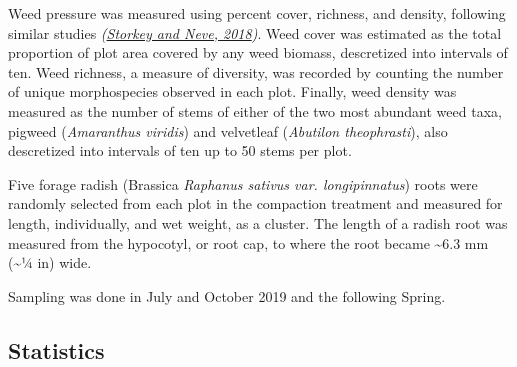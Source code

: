 \documentclass[
  12pt,
]{article}
\begin{document}
Weed pressure was measured using percent cover, richness, and density, following similar studies \emph{(\protect\hyperlink{ref-storkey18}{Storkey and Neve, 2018})}.
Weed cover was estimated as the total proportion of plot area covered by any weed biomass, descretized into intervals of ten.
Weed richness, a measure of diversity, was recorded by counting the number of unique morphospecies observed in each plot.
Finally, weed density was measured as the number of stems of either of the two most abundant weed taxa, pigweed (\emph{Amaranthus viridis}) and velvetleaf (\emph{Abutilon theophrasti}), also descretized into intervals of ten up to 50 stems per plot.

Five forage radish (Brassica \emph{Raphanus sativus var. longipinnatus}) roots were randomly selected from each plot in the compaction treatment and measured for length, individually, and wet weight, as a cluster.
The length of a radish root was measured from the hypocotyl, or root cap, to where the root became \textasciitilde6.3 mm (\textasciitilde1⁄4 in) wide.

Sampling was done in July and October 2019 and the following Spring.

\hypertarget{statistics}{%
\subsection{Statistics}\label{statistics}}
\end{document}

